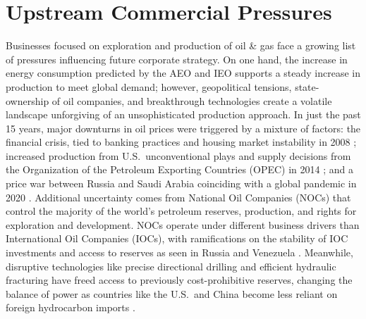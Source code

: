 \section{Upstream Commercial Pressures}\label{ch1:upstream}
Businesses focused on exploration and production of oil \& gas face a growing list of pressures influencing future corporate strategy. On one hand, the increase in energy consumption predicted by the AEO and IEO supports a steady increase in production to meet global demand; however, geopolitical tensions, state-ownership of oil companies, and breakthrough technologies create a volatile landscape unforgiving of an unsophisticated production approach. In just the past 15 years, major downturns in oil prices were triggered by a mixture of factors: the financial crisis, tied to banking practices and housing market instability in 2008 \citep{singh_2007-2008_2021}; increased production from U.S.\ unconventional plays and supply decisions from the Organization of the Petroleum Exporting Countries (OPEC) in 2014 \citep{lioudis_what_2021}; and a price war between Russia and Saudi Arabia coinciding with a global pandemic in 2020 \citep{blessing_what_2021}. Additional uncertainty comes from National Oil Companies (NOCs) that control the majority of the world’s petroleum reserves, production, and rights for exploration and development. NOCs operate under different business drivers than International Oil Companies (IOCs), with ramifications on the stability of IOC investments and access to reserves as seen in Russia and Venezuela \citep{bremmer_long_2010,pirog_role_2007}. Meanwhile, disruptive technologies like precise directional drilling and efficient hydraulic fracturing have freed access to previously cost-prohibitive reserves, changing the balance of power as countries like the U.S.\ and China become less reliant on foreign hydrocarbon imports \citep{shuen_dynamic_2014}.

